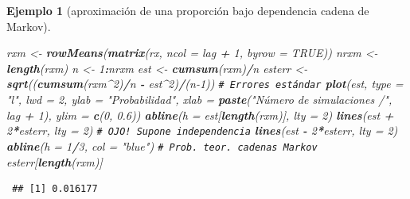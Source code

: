 \documentclass[
  spanish,
  10pt,
]{book}
\newenvironment{Shaded}{\begin{snugshade}}{\end{snugshade}}
\newcommand{\AttributeTok}[1]{\textcolor[rgb]{0.13,0.29,0.53}{#1}}
\newcommand{\CommentTok}[1]{\textcolor[rgb]{0.56,0.35,0.01}{\textit{#1}}}
\newcommand{\ConstantTok}[1]{\textcolor[rgb]{0.56,0.35,0.01}{#1}}
\newcommand{\DecValTok}[1]{\textcolor[rgb]{0.00,0.00,0.81}{#1}}
\newcommand{\FloatTok}[1]{\textcolor[rgb]{0.00,0.00,0.81}{#1}}
\newcommand{\FunctionTok}[1]{\textcolor[rgb]{0.13,0.29,0.53}{\textbf{#1}}}
\newcommand{\NormalTok}[1]{#1}
\newcommand{\OtherTok}[1]{\textcolor[rgb]{0.56,0.35,0.01}{#1}}
\newcommand{\SpecialCharTok}[1]{\textcolor[rgb]{0.81,0.36,0.00}{\textbf{#1}}}
\newcommand{\StringTok}[1]{\textcolor[rgb]{0.31,0.60,0.02}{#1}}
\theoremstyle{break}
\newtheorem{example}{Ejemplo}[chapter]
\theoremstyle{nonumberplain}
\renewcommand{\CommentTok}[1]{\textcolor[rgb]{0.41,0.41,0.41}{\texttt{#1}}}
\begin{document}
\begin{example}[aproximación de una proporción bajo dependencia cadena de Markov]
\begin{Shaded}
\begin{Highlighting}[]
\NormalTok{rxm }\OtherTok{\textless{}{-}} \FunctionTok{rowMeans}\NormalTok{(}\FunctionTok{matrix}\NormalTok{(rx, }\AttributeTok{ncol =}\NormalTok{ lag }\SpecialCharTok{+} \DecValTok{1}\NormalTok{, }\AttributeTok{byrow =} \ConstantTok{TRUE}\NormalTok{))}
\NormalTok{nrxm }\OtherTok{\textless{}{-}} \FunctionTok{length}\NormalTok{(rxm)}
\NormalTok{n }\OtherTok{\textless{}{-}} \DecValTok{1}\SpecialCharTok{:}\NormalTok{nrxm}
\NormalTok{est }\OtherTok{\textless{}{-}} \FunctionTok{cumsum}\NormalTok{(rxm)}\SpecialCharTok{/}\NormalTok{n}
\NormalTok{esterr }\OtherTok{\textless{}{-}} \FunctionTok{sqrt}\NormalTok{((}\FunctionTok{cumsum}\NormalTok{(rxm}\SpecialCharTok{\^{}}\DecValTok{2}\NormalTok{)}\SpecialCharTok{/}\NormalTok{n }\SpecialCharTok{{-}}\NormalTok{ est}\SpecialCharTok{\^{}}\DecValTok{2}\NormalTok{)}\SpecialCharTok{/}\NormalTok{(n}\DecValTok{{-}1}\NormalTok{)) }\CommentTok{\# Errores estándar}
\FunctionTok{plot}\NormalTok{(est, }\AttributeTok{type =} \StringTok{"l"}\NormalTok{, }\AttributeTok{lwd =} \DecValTok{2}\NormalTok{, }\AttributeTok{ylab =} \StringTok{"Probabilidad"}\NormalTok{, }
     \AttributeTok{xlab =} \FunctionTok{paste}\NormalTok{(}\StringTok{"Número de simulaciones /"}\NormalTok{, lag }\SpecialCharTok{+} \DecValTok{1}\NormalTok{), }\AttributeTok{ylim =} \FunctionTok{c}\NormalTok{(}\DecValTok{0}\NormalTok{, }\FloatTok{0.6}\NormalTok{))}
\FunctionTok{abline}\NormalTok{(}\AttributeTok{h =}\NormalTok{ est[}\FunctionTok{length}\NormalTok{(rxm)], }\AttributeTok{lty =} \DecValTok{2}\NormalTok{)}
\FunctionTok{lines}\NormalTok{(est }\SpecialCharTok{+} \DecValTok{2}\SpecialCharTok{*}\NormalTok{esterr, }\AttributeTok{lty =} \DecValTok{2}\NormalTok{) }\CommentTok{\# OJO! Supone independencia}
\FunctionTok{lines}\NormalTok{(est }\SpecialCharTok{{-}} \DecValTok{2}\SpecialCharTok{*}\NormalTok{esterr, }\AttributeTok{lty =} \DecValTok{2}\NormalTok{)}
\FunctionTok{abline}\NormalTok{(}\AttributeTok{h =} \DecValTok{1}\SpecialCharTok{/}\DecValTok{3}\NormalTok{, }\AttributeTok{col =} \StringTok{"blue"}\NormalTok{)  }\CommentTok{\# Prob. teor. cadenas Markov}
\NormalTok{esterr[}\FunctionTok{length}\NormalTok{(rxm)]}
\end{Highlighting}
\end{Shaded}

\begin{verbatim}
 ## [1] 0.016177
\end{verbatim}

\begin{figure}[!htbp]


\end{figure}
\end{example}
\end{document}
